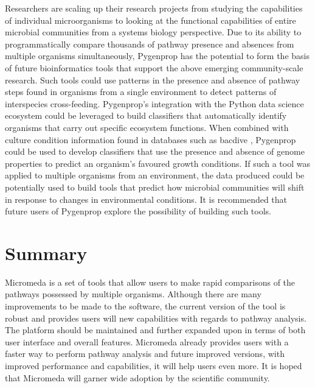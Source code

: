 Researchers are scaling up their research projects from studying the 
capabilities of individual microorganisms to looking at the functional 
capabilities of entire microbial communities from a systems biology perspective. 
Due to its ability to programmatically compare thousands of pathway presence and 
absences from multiple organisms simultaneously, Pygenprop has the potential to 
form the basis of future bioinformatics tools that support the above emerging 
community-scale research. Such tools could use patterns in the presence and 
absence of pathway steps found in organisms from a single environment to detect 
patterns of interspecies cross-feeding. Pygenprop's integration with the Python 
data science ecosystem could be leveraged to build classifiers that 
automatically identify organisms that carry out specific ecosystem functions. 
When combined with culture condition information found in databases such as 
\gls{bacdive} \cite{reimer2018bac}, Pygenprop could be used to develop classifiers 
that use the presence and absence of genome properties to predict an organism's 
favoured growth conditions. If such a tool was applied to multiple organisms 
from an environment, the data produced could be potentially used to build tools 
that predict how microbial communities will shift in response to changes in 
environmental conditions. It is recommended that future users of Pygenprop 
explore the possibility of building such tools.

\section{Summary}

Micromeda is a set of tools that allow users to make rapid comparisons of the 
pathways possessed by multiple organisms. Although there are many improvements 
to be made to the software, the current version of the tool is robust and 
provides users will new capabilities with regards to pathway analysis. The 
platform should be maintained and further expanded upon in terms of both user 
interface and overall features. Micromeda already provides users with a faster 
way to perform pathway analysis and future improved versions, with improved 
performance and capabilities, it will help users even more. It is hoped that 
Micromeda will garner wide adoption by the scientific community.
